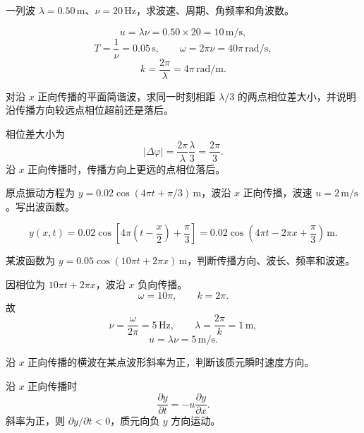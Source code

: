 \begin{exercise}[level=standard]
一列波 $\lambda=0.50\,\mathrm{m}$、$\nu=20\,\mathrm{Hz}$，求波速、周期、角频率和角波数。
\begin{solution}
\[
  u=\lambda\nu=0.50\times20=10\,\mathrm{m/s},
\]
\[
  T=\frac1\nu=0.05\,\mathrm{s},\qquad
  \omega=2\pi\nu=40\pi\,\mathrm{rad/s},
\]
\[
  k=\frac{2\pi}{\lambda}=4\pi\,\mathrm{rad/m}.
\]
\end{solution}
\end{exercise}

\begin{exercise}[level=standard]
对沿 $x$ 正向传播的平面简谐波，求同一时刻相距 $\lambda/3$ 的两点相位差大小，并说明沿传播方向较远点相位超前还是落后。
\begin{solution}
相位差大小为
\[
  |\Delta\varphi|=\frac{2\pi}{\lambda}\frac{\lambda}{3}
  =\frac{2\pi}{3}.
\]
沿 $x$ 正向传播时，传播方向上更远的点相位落后。
\end{solution}
\end{exercise}

\begin{exercise}[level=standard]
原点振动方程为 $y=0.02\cos(4\pi t+\pi/3)\,\mathrm{m}$，波沿 $x$ 正向传播，波速 $u=2\,\mathrm{m/s}$。写出波函数。
\begin{solution}
\[
  y(x,t)=0.02\cos\left[4\pi\left(t-\frac{x}{2}\right)+\frac{\pi}{3}\right]
  =0.02\cos\left(4\pi t-2\pi x+\frac{\pi}{3}\right)\,\mathrm{m}.
\]
\end{solution}
\end{exercise}

\begin{exercise}[level=standard]
某波函数为 $y=0.05\cos(10\pi t+2\pi x)\,\mathrm{m}$，判断传播方向、波长、频率和波速。
\begin{solution}
因相位为 $10\pi t+2\pi x$，波沿 $x$ 负向传播。
\[
  \omega=10\pi,\qquad k=2\pi.
\]
故
\[
  \nu=\frac{\omega}{2\pi}=5\,\mathrm{Hz},\qquad
  \lambda=\frac{2\pi}{k}=1\,\mathrm{m},
\]
\[
  u=\lambda\nu=5\,\mathrm{m/s}.
\]
\end{solution}
\end{exercise}

\begin{exercise}[level=standard]
沿 $x$ 正向传播的横波在某点波形斜率为正，判断该质元瞬时速度方向。
\begin{solution}
沿 $x$ 正向传播时
\[
  \frac{\partial y}{\partial t}=-u\frac{\partial y}{\partial x}.
\]
斜率为正，则 $\partial y/\partial t<0$，质元向负 $y$ 方向运动。
\end{solution}
\end{exercise}

